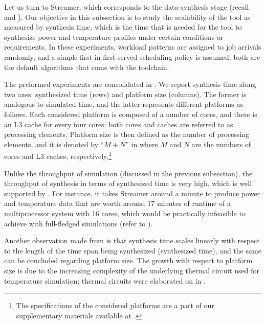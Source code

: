 
Let us turn to Streamer, which corresponds to the data-synthesis stage (recall
 and ). Our objective in this subsection is to
study the scalability of the tool as measured by synthesis time, which is the
time that is needed for the tool to synthesize power and temperature profiles
under certain conditions or requirements. In these experiments, workload
patterns are assigned to job arrivals randomly, and a simple
first-in-first-served scheduling policy is assumed; both are the default
algorithms that come with the toolchain.

The preformed experiments are consolidated in . We report
synthesis time along two axes: synthesized time (rows) and platform size
(columns). The former is analogous to simulated time, and the latter represents
different platforms as follows. Each considered platform is composed of a number
of cores, and there is an L3 cache for every four cores; both cores and caches
are referred to as processing elements. Platform size is then defined as the
number of processing elements, and it is denoted by ``$M + N$'' in
 where $M$ and $N$ are the numbers of cores and L3 caches,
respectively.\footnote{The specifications of the considered platforms are a part
of our supplementary materials available at \cite{sources}.}

Unlike the throughput of simulation (discussed in the previous subsection), the
throughput of synthesis in terms of synthesized time is very high, which is well
supported by . For instance, it takes Streamer around a minute
to produce power and temperature data that are worth around 17 minutes of
runtime of a multiprocessor system with 16 cores, which would be practically
infeasible to achieve with full-fledged simulations (refer to ).

Another observation made from  is that synthesis time scales
linearly with respect to the length of the time span being synthesized
(synthesized time), and the same can be concluded regarding platform size. The
growth with respect to platform size is due to the increasing complexity of the
underlying thermal  circuit used for temperature simulation; thermal
circuits were elaborated on in .
